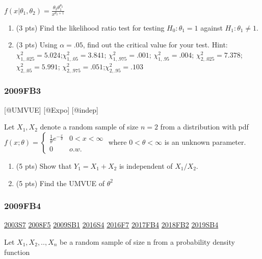 \documentclass[6pt,Portrait]{article}
\begin{document}
\(f(x|\theta_1,\theta_2)=\frac{\theta_2\theta_1^{\theta_2}}{x^{\theta_2+1}}\)

\begin{enumerate}
\def\labelenumi{(\alph{enumi})}
\setcounter{enumi}{1}
\item
  (3 pts) Find the likelihood ratio test for testing \(H_0:\theta_1=1\)
  against \(H_1:\theta_1\neq1\).
\item
  (3 pts) Using \(\alpha=.05\), find out the critical value for your
  test. Hint: \(\chi^2_{1,.025}= 5.024\);\(\chi^2_{1,.05}= 3.841\);
  \(\chi^2_{1,.975}=.001\); \(\chi^2_{1,.95}=.004\);
  \(\chi^2_{2,.025}=7.378\); \(\chi^2_{2,.05}= 5.991\);
  \(\chi^2_{2,.975}=.051\);\(\chi^2_{2,.95}=.103\)
\end{enumerate}

\hypertarget{fb3}{%
\subsubsection{2009FB3}\label{fb3}}

{[}@UMVUE{]} {[}@Expo{]} {[}@indep{]}

Let \(X_1,X_2\) denote a random sample of size \(n=2\) from a
distribution with pdf
\(f(x;\theta)=\begin{cases}\frac1\theta e^{-\frac{x}\theta}& 0<x<\infty\\0& o.w.\end{cases}\)
where \(0<\theta<\infty\) is an unknown parameter.

\begin{enumerate}
\def\labelenumi{(\alph{enumi})}
\item
  (5 pts) Show that \(Y_1=X_1+X_2\) is independent of \(X_1/X_2\).
\item
  (5 pts) Find the UMVUE of \(\theta^2\)
\end{enumerate}

\hypertarget{fb4}{%
\subsubsection{2009FB4}\label{fb4}}

\protect\hyperlink{s7}{2003S7} \protect\hyperlink{f5-3}{2008F5}
\protect\hyperlink{sb1}{2009SB1} \protect\hyperlink{s4-4}{2016S4}
\protect\hyperlink{f7-5}{2016F7} \protect\hyperlink{fb4-3}{2017FB4}
\protect\hyperlink{fb2-4}{2018FB2} \protect\hyperlink{sb4-2}{2019SB4}

Let \(X_1,X_2,..,X_n\) be a random sample of size n from a probability
density function
\end{document}
